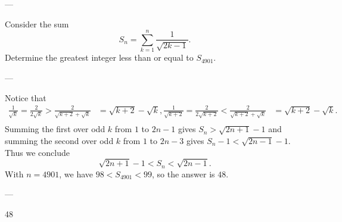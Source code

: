 
---

Consider the sum \[S_n=\sum_{k=1}^n\frac1{\sqrt{2k-1}}.\]
Determine the greatest integer less than or equal to $S_{4901}$.

---

Notice that
\begin{align*}
    \frac1{\sqrt k}=\frac2{2\sqrt k}>\frac2{\sqrt{k+2}+\sqrt k}&=\sqrt{k+2}-\sqrt k,
    \frac1{\sqrt{k+2}}=\frac2{2\sqrt{k+2}}<\frac2{\sqrt{k+2}+\sqrt k}&=\sqrt{k+2}-\sqrt k.\\
\end{align*}
Summing the first over odd $k$ from $1$ to $2n-1$ gives $S_n>\sqrt{2n+1}-1$ and summing the second over odd $k$ from $1$ to $2n-3$ gives $S_n-1<\sqrt{2n-1}-1$. Thus we conclude \[\sqrt{2n+1}-1<S_n<\sqrt{2n-1}.\]
With $n=4901$, we have $98<S_{4901}<99$, so the answer is $48$.

---

48
